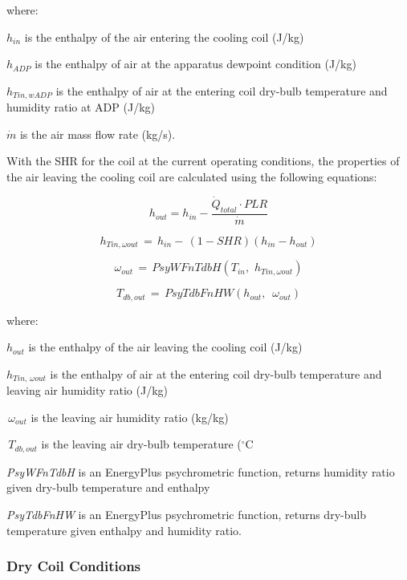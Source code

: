 where:

\({h_{in}}\) is the enthalpy of the air entering the cooling coil (J/kg)

\({h_{ADP}}\) is the enthalpy of air at the apparatus dewpoint condition (J/kg)

\({h_{Tin,wADP}}\) is the enthalpy of air at the entering coil dry-bulb temperature and humidity ratio at ADP (J/kg)

\(\dot m\) is the air mass flow rate (kg/s).

With the SHR for the coil at the current operating conditions, the properties of the air leaving the cooling coil are calculated using the following equations:

\begin{equation}
 h_{out} = h_{in} - \frac{\dot{Q}_{total}\cdot PLR}{\dot{m}}
\label{eq:CoilSHRhout}
\end{equation}

\begin{equation}
{h_{Tin,\omega out}}\, = \,{h_{in}} - \,\left( {1 - SHR} \right)\left( {{h_{in}} - {h_{out}}} \right)
\end{equation}

\begin{equation}
{\omega_{out}}\, = \,PsyWFnTdbH({T_{in}},\,\,{h_{Tin,\omega out}})
\label{eq:CoilSHRomegaout}
\end{equation}

\begin{equation}
{T_{db,out}}\, = \,PsyTdbFnHW({h_{out}},\,\,\,{\omega_{out}})
\label{eq:CoilSHRTdbout}
\end{equation}

where:

\({h_{out}}\) is the enthalpy of the air leaving the cooling coil (J/kg)

\({h_{Tin,\,\omega out}}\) is the enthalpy of air at the entering coil dry-bulb temperature and leaving air humidity ratio (J/kg)

\(\,{\omega_{out}}\) is the leaving air humidity ratio (kg/kg)

\(\,{T_{db,out}}\) is the leaving air dry-bulb temperature (\(^{\circ}\)C

\emph{PsyWFnTdbH} is an EnergyPlus psychrometric function, returns humidity ratio given dry-bulb temperature and enthalpy

\emph{PsyTdbFnHW} is an EnergyPlus psychrometric function, returns dry-bulb temperature given enthalpy and humidity ratio.

\subsubsection{Dry Coil Conditions}\label{dry-coil-conditions}

